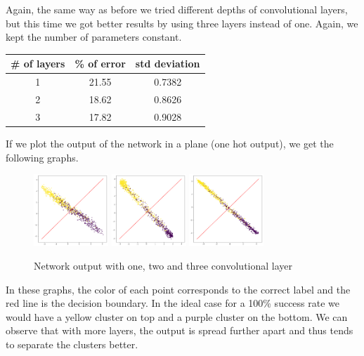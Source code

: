 \documentclass{article}
\begin{document}
Again, the same way as before we tried different depths of convolutional layers, but this time we got better results by using three layers instead of one. Again, we kept the number of parameters constant.

\begin{center}
\begin{tabular}{|c|c|c|}
\hline 
\# of layers & \% of error & std deviation \\ 
\hline 
1 & 21.55 & 0.7382 \\ 
\hline 
2 & 18.62 & 0.8626 \\ 
\hline 
3 & 17.82 & 0.9028 \\ 
\hline 
\end{tabular}
\end{center} 

If we plot the output of the network in a plane (one hot output), we get the following graphs.

\begin{figure}[H]
\begin{center}
\includegraphics[width=0.25\textwidth]{ws_conv1}
\includegraphics[width=0.25\textwidth]{ws_conv2}
\includegraphics[width=0.25\textwidth]{ws_conv3}
\caption{Network output with one, two and three convolutional layer}
\end{center}
\end{figure}

In these graphs, the color of each point corresponds to the correct label and the red line is the decision boundary. In the ideal case for a 100\% success rate we would have a yellow cluster on top and a purple cluster on the bottom. We can observe that with more layers, the output is spread further apart and thus tends to separate the clusters better.
\end{document}
